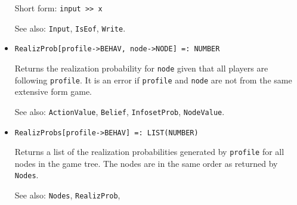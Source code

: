 \begin{itemize}
{\it for} {\tt T = BOOLEAN, NUMBER, TEXT}
\bd
Reads data of type \verb+T+ from the input stream and assigns it to
\verb+x+.  If \verb+x+ is undefined, then its data type is determined
from the exposed data in the input stream.  If \verb+x+ is previously
defined, then the \verb+Read+ function will expect to find the
corresponding data type in the input stream, and a file read error
will be generated if the exposed data is of the wrong data type.  If
\verb+x+ is previously defined to be a \verb+LIST+, then \verb+Read[in,x]+
will successively read elements into each element of the list.  If the
wrong data type is found for any element of the list, a file read
error will be returned.

The ``exposed data'' in the input stream consists of the following: If
first character is a double quote (\verb+"+), then the exposed data
consists of all characters up until the next double quote.  If the
first character is a \verb+{+, then the exposed data consists of all
the characters up until the next matching \verb+}+.  Otherwise, the
exposed data consists of all characters until the next whitespace.
\item [Short form:] \verb+input >> x+
\item [See also:] \verb+Input+, \verb+IsEof+, \verb+Write+.
\ed

\item{}
\protect \large \begin{verbatim}
RealizProb[profile->BEHAV, node->NODE] =: NUMBER 
\end{verbatim}\normalsize

\bd
Returns the realization probability for \verb+node+ given that all players
are following \verb+profile+.  It is an error if \verb+profile+ and
\verb+node+ are not from the same extensive form game.
\item [See also:] \verb+ActionValue+, \verb+Belief+, \verb+InfosetProb+,
\verb+NodeValue+.
\ed

\item{}
\protect \large \begin{verbatim}
RealizProbs[profile->BEHAV] =: LIST(NUMBER) 
\end{verbatim}\normalsize

\bd

Returns a list of the realization probabilities generated by
\verb+profile+ for all nodes in the game tree.  The nodes are in the
same order as returned by \verb+Nodes+.
\item [See also:] \verb+Nodes+, \verb+RealizProb+, 
\ed


\end{itemize}
